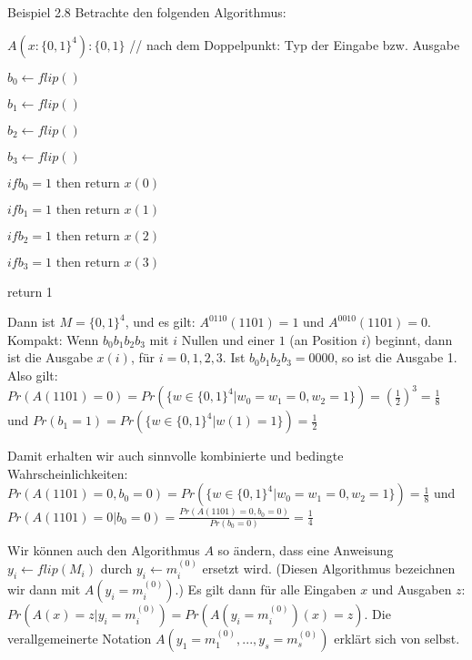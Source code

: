 \documentclass[a4paper]{article}
\begin{document}
\begin{multicols}{3}
    Beispiel 2.8 Betrachte den folgenden Algorithmus:
    \begin{itemize*}
        \item $A(x:\{0,1\}^4):\{0,1\}$        // nach dem Doppelpunkt: Typ der Eingabe bzw. Ausgabe
        \item $b_0 \leftarrow flip()$
        \item $b_1 \leftarrow flip()$
        \item $b_2 \leftarrow flip()$
        \item $b_3 \leftarrow flip()$
        \item $if b_0 = 1 \text{ then return } x(0)$
        \item $if b_1 = 1 \text{ then return } x(1)$
        \item $if b_2 = 1 \text{ then return } x(2)$
        \item $if b_3 = 1 \text{ then return } x(3)$
        \item return 1
    \end{itemize*}

    Dann ist $M=\{0,1\}^4$, und es gilt: $A^{0110}(1101)=1$ und $A^{0010}(1101)=0$. Kompakt: Wenn $b_0 b_1 b_2 b_3$ mit $i$ Nullen und einer $1$ (an Position $i$) beginnt, dann ist die Ausgabe $x(i)$, für $i=0,1,2,3$. Ist $b_0 b_1 b_2 b_3=0000$, so ist die Ausgabe 1. Also gilt: $Pr(A(1101)=0) = Pr(\{w\in\{0,1\}^4 |w_0=w_1=0, w_2=1\}) =(\frac{1}{2})^3 =\frac{1}{8}$ und $Pr(b_1=1) =Pr(\{w\in\{0,1\}^4 |w(1)=1\})=\frac{1}{2}$

    Damit erhalten wir auch sinnvolle kombinierte und bedingte Wahrscheinlichkeiten: $Pr(A(1101)=0, b_0=0)= Pr(\{w\in\{0,1\}^4 |w_0=w_1=0, w_2=1\}) =\frac{1}{8}$ und $Pr(A(1101)=0| b_0=0) =\frac{Pr(A(1101)=0, b_0=0)}{Pr(b_0=0)}=\frac{1}{4}$

    Wir können auch den Algorithmus $A$ so ändern, dass eine Anweisung $y_i\leftarrow flip(M_i)$ durch $y_i\leftarrow m^{(0)}_i$ ersetzt wird. (Diesen Algorithmus bezeichnen wir dann mit $A(y_i=m^{(0)}_i)$.) Es gilt dann für alle Eingaben $x$ und Ausgaben $z$: $Pr(A(x)=z| y_i=m^{(0)}_i) =Pr(A(y_i=m^{(0)}_i)(x) =z)$. Die verallgemeinerte Notation $A(y_1=m^{(0)}_1,...,y_s=m^{(0)}_s)$ erklärt sich von selbst.


\end{multicols}
\end{document}
